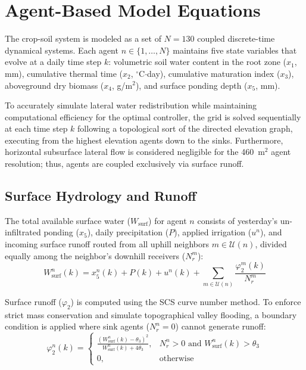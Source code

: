 \section{Agent-Based Model Equations}
\label{sec:abm_equations}

The crop-soil system is modeled as a set of $N=130$ coupled discrete-time dynamical systems. Each agent $n \in \{1, \dots, N\}$ maintains five state variables that evolve at a daily time step $k$: volumetric soil water content in the root zone ($x_1$, mm), cumulative thermal time ($x_2$, $^{\circ}$C$\cdot$day), cumulative maturation index ($x_3$), aboveground dry biomass ($x_4$, g/m$^2$), and surface ponding depth ($x_5$, mm).

To accurately simulate lateral water redistribution while maintaining computational efficiency for the optimal controller, the grid is solved sequentially at each time step $k$ following a topological sort of the directed elevation graph, executing from the highest elevation agents down to the sinks. Furthermore, horizontal subsurface lateral flow is considered negligible for the 460~m$^2$ agent resolution; thus, agents are coupled exclusively via surface runoff.

\subsection{Surface Hydrology and Runoff}

The total available surface water ($W_{\text{surf}}$) for agent $n$ consists of yesterday's un-infiltrated ponding ($x_5$), daily precipitation ($P$), applied irrigation ($u^n$), and incoming surface runoff routed from all uphill neighbors $m \in \mathcal{U}(n)$, divided equally among the neighbor's downhill receivers ($N_r^m$):
\begin{equation}
    W_{\text{surf}}^n(k) = x_5^n(k) + P(k) + u^n(k) + \sum_{m \in \mathcal{U}(n)} \frac{\varphi_2^m(k)}{N_r^m}
\end{equation}

Surface runoff ($\varphi_2$) is computed using the SCS curve number method. To enforce strict mass conservation and simulate topographical valley flooding, a boundary condition is applied where sink agents ($N_r^n = 0$) cannot generate runoff:
\begin{equation}
    \varphi_2^n(k) = 
    \begin{cases}  
      \frac{(W_{\text{surf}}^n(k) - \theta_3)^2}{W_{\text{surf}}^n(k) + 4\theta_3}, & N_r^n > 0 \text{ and } W_{\text{surf}}^n(k) > \theta_3 \\
      0, & \text{otherwise} 
   \end{cases}
\end{equation}

